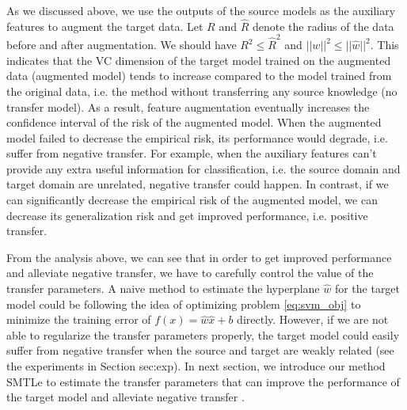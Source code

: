 As we discussed above, we use the outputs of the source models as the auxiliary features to augment the target data. Let $R$ and $\hat{R}$ denote the radius of the data before and after augmentation. We should have $R^2 \le \hat{R}^2$ and $||w||^2\le ||\hat{w}||^2$. This indicates that the VC dimension of the target model trained on the augmented data (augmented model) tends to increase compared to the model trained from the original data, i.e.  the method without transferring any source knowledge (no transfer model). As a result, feature augmentation eventually increases the confidence interval of the risk of the augmented model. When the augmented model failed to decrease the empirical risk, its performance would degrade, i.e. suffer from negative transfer. For example, when the auxiliary features can't provide any extra useful information for classification, i.e. the source domain and target domain are unrelated, negative transfer could happen. In contrast, if we can significantly decrease the empirical risk of the augmented model, we can decrease its generalization risk and get improved performance, i.e. positive transfer.

From the analysis above, we can see that in order to get improved performance and alleviate negative transfer, we have to carefully control the value of the transfer parameters. A naive method to estimate the hyperplane $\hat{w}$ for the target model could be following the idea of optimizing problem \eqref{eq:svm_obj} to minimize the training error of $f(x)=\hat{w}\hat{x}+b$ directly. However, if we are not able to regularize the transfer parameters properly, the target model could easily suffer from negative transfer when the source and target are weakly related (see the experiments in Section sec:exp).
In next section, we introduce our method SMTLe to estimate the transfer parameters that can improve the performance of the target model and alleviate negative transfer .

